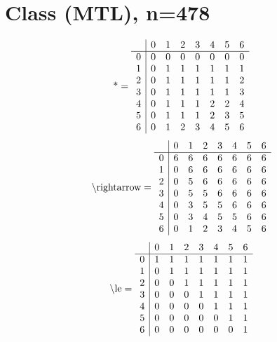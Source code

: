\documentclass[11pt]{article}
\begin{document}
\section{Class (MTL), n=478}
\[\text{*} = 
\begin{array}{r | r r r r r r r}
 & 0 & 1 & 2 & 3 & 4 & 5 & 6 \\ \hline
0 & 0 & 0 & 0 & 0 & 0 & 0 & 0 \\
1 & 0 & 1 & 1 & 1 & 1 & 1 & 1 \\
2 & 0 & 1 & 1 & 1 & 1 & 1 & 2 \\
3 & 0 & 1 & 1 & 1 & 1 & 1 & 3 \\
4 & 0 & 1 & 1 & 1 & 2 & 2 & 4 \\
5 & 0 & 1 & 1 & 1 & 2 & 3 & 5 \\
6 & 0 & 1 & 2 & 3 & 4 & 5 & 6 \\
\end{array}
\]
\[\text{\textbackslash rightarrow} = 
\begin{array}{r | r r r r r r r}
 & 0 & 1 & 2 & 3 & 4 & 5 & 6 \\ \hline
0 & 6 & 6 & 6 & 6 & 6 & 6 & 6 \\
1 & 0 & 6 & 6 & 6 & 6 & 6 & 6 \\
2 & 0 & 5 & 6 & 6 & 6 & 6 & 6 \\
3 & 0 & 5 & 5 & 6 & 6 & 6 & 6 \\
4 & 0 & 3 & 5 & 5 & 6 & 6 & 6 \\
5 & 0 & 3 & 4 & 5 & 5 & 6 & 6 \\
6 & 0 & 1 & 2 & 3 & 4 & 5 & 6 \\
\end{array}
\]
\[\text{\textbackslash le} = 
\begin{array}{r | r r r r r r r}
 & 0 & 1 & 2 & 3 & 4 & 5 & 6 \\ \hline
0 & 1 & 1 & 1 & 1 & 1 & 1 & 1 \\
1 & 0 & 1 & 1 & 1 & 1 & 1 & 1 \\
2 & 0 & 0 & 1 & 1 & 1 & 1 & 1 \\
3 & 0 & 0 & 0 & 1 & 1 & 1 & 1 \\
4 & 0 & 0 & 0 & 0 & 1 & 1 & 1 \\
5 & 0 & 0 & 0 & 0 & 0 & 1 & 1 \\
6 & 0 & 0 & 0 & 0 & 0 & 0 & 1 \\
\end{array}
\]
\end{document}
